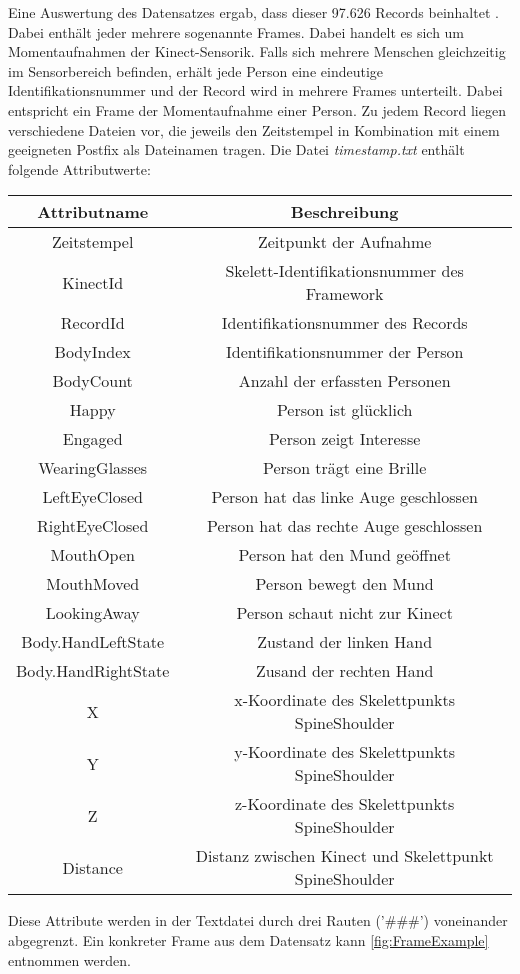 Eine Auswertung des Datensatzes ergab, dass dieser 97.626 Records beinhaltet \citep{temiz_konzeption_2022}.
Dabei enthält jeder mehrere sogenannte Frames.
Dabei handelt es sich um Momentaufnahmen der Kinect-Sensorik.
Falls sich mehrere Menschen gleichzeitig im Sensorbereich befinden,
erhält jede Person eine eindeutige Identifikationsnummer
und der Record wird in mehrere Frames unterteilt.
Dabei entspricht ein Frame der Momentaufnahme einer Person.
Zu jedem Record liegen verschiedene Dateien vor,
die jeweils den Zeitstempel in Kombination mit einem geeigneten Postfix als Dateinamen tragen.
Die Datei \emph{timestamp.txt} enthält folgende Attributwerte:
\begin{center}
  \begin{tabular}{ |c|c| } 
   \hline
   Attributname & Beschreibung \\
   \hline \hline
   Zeitstempel & Zeitpunkt der Aufnahme \\
   \hline
   KinectId & Skelett-Identifikationsnummer des Framework  \\
   \hline
   RecordId & Identifikationsnummer des Records \\
   \hline
   BodyIndex & Identifikationsnummer der Person \\
   \hline
   BodyCount & Anzahl der erfassten Personen \\
   \hline
   Happy & Person ist glücklich \\
   \hline
   Engaged & Person zeigt Interesse \\
   \hline
   WearingGlasses & Person trägt eine Brille \\
   \hline
   LeftEyeClosed & Person hat das linke Auge geschlossen \\
   \hline
   RightEyeClosed & Person hat das rechte Auge geschlossen \\
   \hline
   MouthOpen & Person hat den Mund geöffnet \\
   \hline
   MouthMoved & Person bewegt den Mund\\
   \hline
   LookingAway & Person schaut nicht zur Kinect \\
   \hline
   Body.HandLeftState & Zustand der linken Hand \\
   \hline
   Body.HandRightState & Zusand der rechten Hand \\
   \hline
   X & x-Koordinate des Skelettpunkts SpineShoulder \\
   \hline
   Y & y-Koordinate des Skelettpunkts SpineShoulder \\
   \hline
   Z & z-Koordinate des Skelettpunkts SpineShoulder \\
   \hline
   Distance & Distanz zwischen Kinect und Skelettpunkt SpineShoulder \\
   \hline
  \end{tabular}
\end{center}
Diese Attribute werden in der Textdatei durch drei Rauten ('\#\#\#') voneinander abgegrenzt.
Ein konkreter Frame aus dem Datensatz kann \autoref{fig:FrameExample} entnommen werden.

